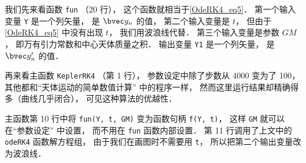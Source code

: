 我们先来看函数 \verb|fun| （20 行）， 这个函数就相当于\autoref{OdeRK4_eq5}． 第一个输入变量 \verb|Y| 是一个列矢量， 是 $\bvec y_n$ 的值， 第二个输入变量是 $t$， 但由于\autoref{OdeRK4_eq5} 中没有出现 $t$， 我们用波浪线代替． 第三个输入变量是参数 $GM$， 即万有引力常数和中心天体质量之积． 输出变量 \verb|Y1| 是一个列矢量， 是 $\bvec y'_n$ 的值．

再来看主函数 \verb|KeplerRK4| （第 1 行）， 参数设定中除了步数从 4000 变为了 100， 其他都和“天体运动的简单数值计算” 中的程序一样， 然而这里运行结果却精确得多（曲线几乎闭合）， 可见这种算法的优越性．

主函数第 10 行中将 \verb|fun(Y, t, GM)| 变为函数句柄 \verb|f(Y, t)|， 这样 \verb|GM| 就可以在“参数设定” 中设置， 而不用在 \verb|fun| 函数内部设置． 第 11 行调用了上文中的 \verb|odeRK4| 函数解方程组， 由于我们在画图时不需要用 \verb|t|， 所以把第二个输出变量改为波浪线．
